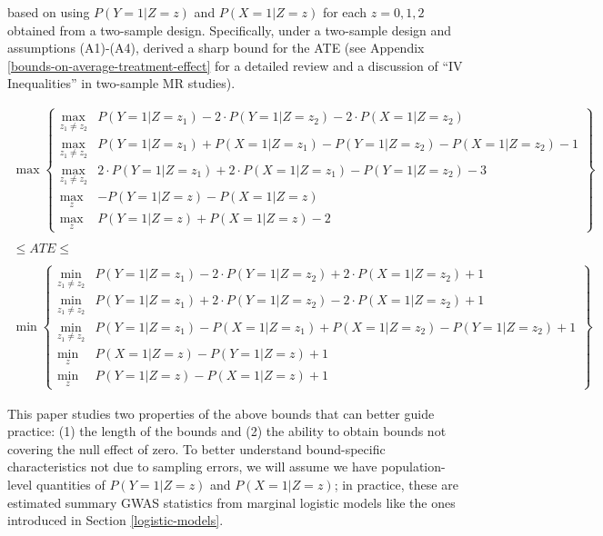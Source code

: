\documentclass[AMA,STIX1COL,]{WileyNJD-v2}
\begin{document}
based on using \(P(Y = 1 | Z = z)\) and \(P(X = 1 | Z = z)\) for each
\(z=0,1,2\) obtained from a two-sample design. Specifically, under a
two-sample design and assumptions (A1)-(A4),
\citep{ramsahai_causal_2012} derived a sharp bound for the ATE (see
Appendix \ref{bounds-on-average-treatment-effect} for a detailed review
and a discussion of ``IV Inequalities''
\citep{balke_bounds_1997, diemer_application_2020} in two-sample MR
studies).

\begin{gather}
\max \left \{
\begin{array}{ll}
  \max_{z_1 \neq z_2} & P(Y = 1 | Z = z_1) - 2\cdot P(Y = 1 | Z = z_2) - 2\cdot P(X = 1 | Z = z_2) \\
  \max_{z_1 \neq z_2} & P(Y = 1 | Z = z_1) + P(X = 1 | Z = z_1) - P(Y = 1 | Z = z_2) - P(X = 1 | Z = z_2) - 1 \\
  \max_{z_1 \neq z_2} & 2\cdot P(Y = 1 | Z = z_1) + 2\cdot P(X = 1 | Z = z_1) - P(Y = 1 | Z = z_2) - 3 \\
  \max_z & -P(Y = 1 | Z = z) - P(X = 1 | Z = z) \\
  \max_z & P(Y = 1 | Z = z) +  P(X = 1 | Z = z) - 2
\end{array}
\right \} \nonumber \\ \nonumber \\
\le ATE \le \label{eq:ate_bound} \\ \nonumber \\
\min \left \{
\begin{array}{ll}
  \min_{z_1 \neq z_2} & P(Y = 1 | Z = z_1) - 2\cdot P(Y = 1 | Z = z_2) +  2\cdot P(X = 1 | Z = z_2) + 1 \\
  \min_{z_1 \neq z_2} & P(Y = 1 | Z = z_1) + 2\cdot P(Y = 1 | Z = z_2) -  2\cdot P(X = 1 | Z = z_2) + 1 \\
  \min_{z_1 \neq z_2} & P(Y = 1 | Z = z_1) - P(X = 1 | Z = z_1) + P(X = 1 | Z = z_2) - P(Y = 1 | Z = z_2) + 1 \\
  \min_z & P(X = 1 | Z = z) - P(Y = 1 | Z = z) + 1 \\
  \min_z & P(Y = 1 | Z = z) - P(X = 1 | Z = z) + 1 
\end{array} 
\right \} \nonumber
\end{gather}

This paper studies two properties of the above bounds that can better
guide practice: (1) the length of the bounds and (2) the ability to
obtain bounds not covering the null effect of zero. To better understand
bound-specific characteristics not due to sampling errors, we will
assume we have population-level quantities of \(P(Y = 1 | Z = z)\) and
\(P(X = 1 | Z = z)\); in practice, these are estimated summary GWAS
statistics from marginal logistic models like the ones introduced in
Section \ref{logistic-models}.
\end{document}

